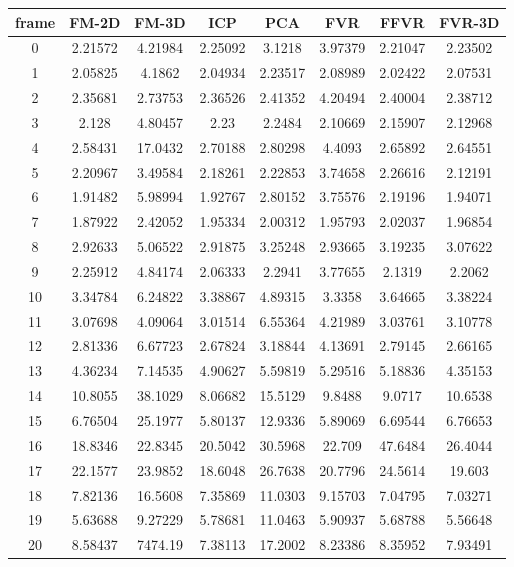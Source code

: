 \begin{figure}
\centering
\begin{tabular}{cccccccc}
\hline
\textbf{frame} & \textbf{FM-2D} & \textbf{FM-3D} & \textbf{ICP} & \textbf{PCA} & \textbf{FVR} & \textbf{FFVR} & \textbf{FVR-3D}
\\ \hline
0 & 2.21572 & 4.21984 & 2.25092 & 3.1218 & 3.97379 & 2.21047 & 2.23502\\
1 & 2.05825 & 4.1862 & 2.04934 & 2.23517 & 2.08989 & 2.02422 & 2.07531\\
2 & 2.35681 & 2.73753 & 2.36526 & 2.41352 & 4.20494 & 2.40004 & 2.38712\\
3 & 2.128 & 4.80457 & 2.23 & 2.2484 & 2.10669 & 2.15907 & 2.12968\\
4 & 2.58431 & 17.0432 & 2.70188 & 2.80298 & 4.4093 & 2.65892 & 2.64551\\
5 & 2.20967 & 3.49584 & 2.18261 & 2.22853 & 3.74658 & 2.26616 & 2.12191\\
6 & 1.91482 & 5.98994 & 1.92767 & 2.80152 & 3.75576 & 2.19196 & 1.94071\\
7 & 1.87922 & 2.42052 & 1.95334 & 2.00312 & 1.95793 & 2.02037 & 1.96854\\
8 & 2.92633 & 5.06522 & 2.91875 & 3.25248 & 2.93665 & 3.19235 & 3.07622\\
9 & 2.25912 & 4.84174 & 2.06333 & 2.2941 & 3.77655 & 2.1319 & 2.2062\\
10 & 3.34784 & 6.24822 & 3.38867 & 4.89315 & 3.3358 & 3.64665 & 3.38224\\
11 & 3.07698 & 4.09064 & 3.01514 & 6.55364 & 4.21989 & 3.03761 & 3.10778\\
12 & 2.81336 & 6.67723 & 2.67824 & 3.18844 & 4.13691 & 2.79145 & 2.66165\\
13 & 4.36234 & 7.14535 & 4.90627 & 5.59819 & 5.29516 & 5.18836 & 4.35153\\
14 & 10.8055 & 38.1029 & 8.06682 & 15.5129 & 9.8488 & 9.0717 & 10.6538\\
15 & 6.76504 & 25.1977 & 5.80137 & 12.9336 & 5.89069 & 6.69544 & 6.76653\\
16 & 18.8346 & 22.8345 & 20.5042 & 30.5968 & 22.709 & 47.6484 & 26.4044\\
17 & 22.1577 & 23.9852 & 18.6048 & 26.7638 & 20.7796 & 24.5614 & 19.603\\
18 & 7.82136 & 16.5608 & 7.35869 & 11.0303 & 9.15703 & 7.04795 & 7.03271\\
19 & 5.63688 & 9.27229 & 5.78681 & 11.0463 & 5.90937 & 5.68788 & 5.56648\\
20 & 8.58437 & 7474.19 & 7.38113 & 17.2002 & 8.23386 & 8.35952 & 7.93491\\

\end{tabular}
\end{figure}
